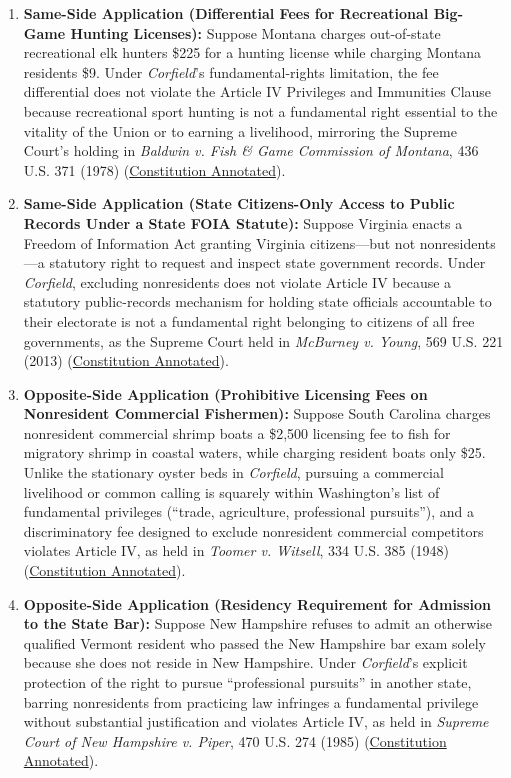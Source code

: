 \documentclass[12pt]{article}
\begin{document}
\begin{enumerate}
\item \textbf{Same-Side Application (Differential Fees for Recreational Big-Game Hunting Licenses):} Suppose Montana charges out-of-state recreational elk hunters \$225 for a hunting license while charging Montana residents \$9. Under \textit{Corfield}'s fundamental-rights limitation, the fee differential does not violate the Article IV Privileges and Immunities Clause because recreational sport hunting is not a fundamental right essential to the vitality of the Union or to earning a livelihood, mirroring the Supreme Court's holding in \textit{Baldwin v. Fish \& Game Commission of Montana}, 436 U.S. 371 (1978) (\href{https://constitution.congress.gov/browse/essay/artIV-S2-C1-7/ALDE_00013783/}{Constitution Annotated}).

\item \textbf{Same-Side Application (State Citizens-Only Access to Public Records Under a State FOIA Statute):} Suppose Virginia enacts a Freedom of Information Act granting Virginia citizens---but not nonresidents---a statutory right to request and inspect state government records. Under \textit{Corfield}, excluding nonresidents does not violate Article IV because a statutory public-records mechanism for holding state officials accountable to their electorate is not a fundamental right belonging to citizens of all free governments, as the Supreme Court held in \textit{McBurney v. Young}, 569 U.S. 221 (2013) (\href{https://constitution.congress.gov/browse/essay/artIV-S2-C1-7/ALDE_00013783/}{Constitution Annotated}).

\item \textbf{Opposite-Side Application (Prohibitive Licensing Fees on Nonresident Commercial Fishermen):} Suppose South Carolina charges nonresident commercial shrimp boats a \$2,500 licensing fee to fish for migratory shrimp in coastal waters, while charging resident boats only \$25. Unlike the stationary oyster beds in \textit{Corfield}, pursuing a commercial livelihood or common calling is squarely within Washington's list of fundamental privileges (``trade, agriculture, professional pursuits''), and a discriminatory fee designed to exclude nonresident commercial competitors violates Article IV, as held in \textit{Toomer v. Witsell}, 334 U.S. 385 (1948) (\href{https://constitution.congress.gov/browse/essay/artIV-S2-C1-7/ALDE_00013783/}{Constitution Annotated}).

\item \textbf{Opposite-Side Application (Residency Requirement for Admission to the State Bar):} Suppose New Hampshire refuses to admit an otherwise qualified Vermont resident who passed the New Hampshire bar exam solely because she does not reside in New Hampshire. Under \textit{Corfield}'s explicit protection of the right to pursue ``professional pursuits'' in another state, barring nonresidents from practicing law infringes a fundamental privilege without substantial justification and violates Article IV, as held in \textit{Supreme Court of New Hampshire v. Piper}, 470 U.S. 274 (1985) (\href{https://constitution.congress.gov/browse/essay/artIV-S2-C1-7/ALDE_00013783/}{Constitution Annotated}).


\end{enumerate}
\end{document}
